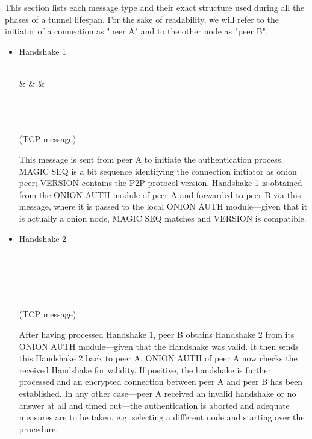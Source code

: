 \documentclass{article}
\begin{document}
This section lists each message type and their exact structure used during all the phases of a tunnel lifespan. For the sake of readability, we will refer to the initiator of a connection as "peer A" and to the other node as "peer B".

\begin{itemize}
	\item Handshake 1 \\

		\begin{bytefield}[bitwidth=1.0em]{32}
			 \\
			& 
			& 
			&  \\
			 \\
			\skippedwords \\	
		\end{bytefield} \\
		(TCP message)
		
		This message is sent from peer A to initiate the authentication process. MAGIC SEQ is a bit sequence identifying the connection initiator as onion peer; VERSION contains the P2P protocol version. Handshake 1 is obtained from the ONION AUTH module of peer A and forwarded to peer B via this message, where it is passed to the local ONION AUTH module---given that it is actually a onion node, MAGIC SEQ matches and VERSION is compatible.
		
	\item Handshake 2 \\

		\begin{bytefield}[bitwidth=1.0em]{32}
			\bitheader{0,7,8,15,16,23,24,31} \\
			\bitbox[lrt]{32}{Handshake 2} \\
			\skippedwords \\				
			\wordbox[blr]{1}{}
		\end{bytefield} \\
		(TCP message)
		
		After having processed Handshake 1, peer B obtains Handshake 2 from its ONION AUTH module---given that the Handshake was valid. It then sends this Handshake 2 back to peer A. ONION AUTH of peer A now checks the received Handshake for validity. If positive, the handshake is further processed and an encrypted connection between peer A and peer B has been established. In any other case---peer A received an invalid handshake or no answer at all and timed out---the authentication is aborted and adequate measures are to be taken, e.g. selecting a different node and starting over the procedure.
	

\end{itemize}
\end{document}
